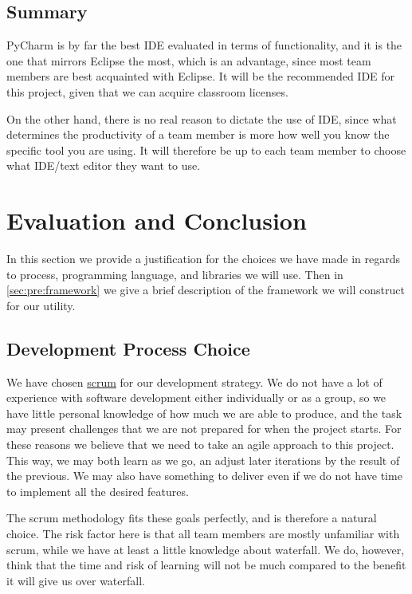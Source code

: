\subsection{Summary}
PyCharm is by far the best IDE evaluated in terms of functionality, and it is
the one that mirrors Eclipse the most, which is an advantage, since most team
members are best acquainted with Eclipse. It will be the recommended IDE for
this project, given that we can acquire classroom licenses.

On the other hand, there is no real reason to dictate the use of IDE, since
what determines the productivity of a team member is more how well you know
the specific tool you are using. It will therefore be up to each team member
to choose what IDE/text editor they want to use.


\section{Evaluation and Conclusion}
\label{sec:pre:eval}
In this section we provide a justification for the choices we have made in
regards to process, programming language, and libraries we will use. Then
in \autoref{sec:pre:framework} we give a brief description of the framework
we will construct for our utility.

\subsection{Development Process Choice}
\label{sec:pre:devchoice}
We have chosen \hyperref[sec:pre:scrum]{scrum} for our development strategy.
We do not have a lot of experience with software development either
individually or as a group, so we have little personal knowledge of how much
we are able to produce, and the task may present challenges that we are not
prepared for when the project starts. For these reasons we believe that we
need to take an agile approach to this project. This way, we may both learn as
we go, an adjust later iterations by the result of the previous. We may also
have something to deliver even if we do not have time to implement all the
desired features.

The scrum methodology fits these goals perfectly, and is therefore a natural
choice. The risk factor here is that all team members are mostly unfamiliar
with scrum, while we have at least a little knowledge about waterfall. We do,
however, think that the time and risk of learning will not be much compared to
the benefit it will give us over waterfall.

